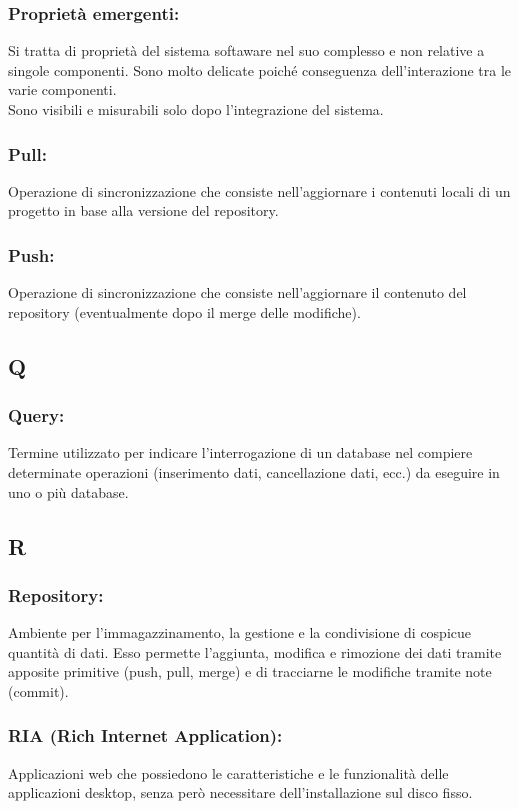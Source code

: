 \subsubsection*{Propriet\`a emergenti:} Si tratta di propriet\`a del sistema
softaware nel suo complesso e non relative a singole componenti. Sono molto
delicate poich\'e conseguenza dell'interazione tra le varie componenti.\\
Sono visibili e misurabili solo dopo l'integrazione del sistema.

\subsubsection*{Pull:} Operazione di sincronizzazione che consiste
nell'aggiornare i contenuti locali di un progetto in base alla versione del repository.

\subsubsection*{Push:} Operazione di sincronizzazione che consiste
nell'aggiornare il contenuto del repository (eventualmente dopo il merge delle modifiche).


\subsection*{\huge{Q}}
\subsubsection*{Query:} Termine utilizzato per indicare l'interrogazione di un
database nel compiere determinate operazioni (inserimento dati, cancellazione
dati, ecc.) da eseguire in uno o pi\`u database.

\subsection*{\huge{R}}

\subsubsection*{Repository:} Ambiente per l'immagazzinamento, la gestione e la
condivisione di cospicue quantit\`a di dati. Esso permette l'aggiunta, modifica
e rimozione dei dati tramite apposite primitive (push, pull, merge) e di
tracciarne le modifiche tramite note (commit).

\subsubsection*{RIA (Rich Internet Application):} Applicazioni web che
possiedono le caratteristiche e le funzionalit\`a delle applicazioni desktop, senza per\`o
necessitare dell'installazione sul disco fisso.
  
